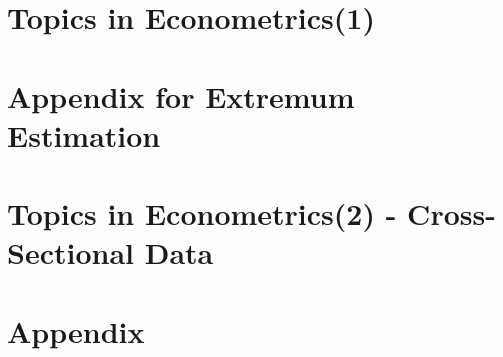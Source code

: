 \documentclass[a4paper]{report}
\begin{document}
\chapter{Topics in Econometrics(1)}

\chapter*{Appendix for Extremum Estimation}
% 
\chapter{Topics in Econometrics(2) - Cross-Sectional Data}



\chapter*{Appendix}

\nocite{*} %


\end{document}
